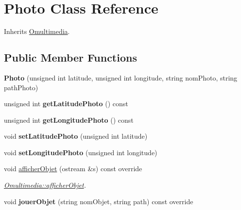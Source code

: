 \hypertarget{class_photo}{\section{Photo Class Reference}
\label{class_photo}
}


Inherits \hyperlink{class_omultimedia}{Omultimedia}.

\subsection*{Public Member Functions}
\begin{DoxyCompactItemize}
\item 
\hypertarget{class_photo_a4b68b4e4c551bbad82073932a0d3e800}{{\bfseries Photo} (unsigned int latitude, unsigned int longitude, string nom\+Photo, string path\+Photo)}\label{class_photo_a4b68b4e4c551bbad82073932a0d3e800}

\item 
\hypertarget{class_photo_a5d7841d5429264d5023baf921efd00b0}{unsigned int {\bfseries get\+Latitude\+Photo} () const }\label{class_photo_a5d7841d5429264d5023baf921efd00b0}

\item 
\hypertarget{class_photo_a081941cde635fe42bd017ef48b5f5ae6}{unsigned int {\bfseries get\+Longitude\+Photo} () const }\label{class_photo_a081941cde635fe42bd017ef48b5f5ae6}

\item 
\hypertarget{class_photo_aae3805bb2c61cb96cc11e7f09fe5bc1c}{void {\bfseries set\+Latitude\+Photo} (unsigned int latitude)}\label{class_photo_aae3805bb2c61cb96cc11e7f09fe5bc1c}

\item 
\hypertarget{class_photo_ab58d0b90b56098457653ffeddb1e03ff}{void {\bfseries set\+Longitude\+Photo} (unsigned int longitude)}\label{class_photo_ab58d0b90b56098457653ffeddb1e03ff}

\item 
void \hyperlink{class_photo_a6c80c6f056b2ec84cc30ad0afecd9806}{afficher\+Objet} (ostream \&s) const override
\begin{DoxyCompactList}\small\item\em \hyperlink{class_omultimedia_ae8942bb1db61d92962a71bbe7512c037}{Omultimedia\+::afficher\+Objet}. \end{DoxyCompactList}\item 
\hypertarget{class_photo_a5b9e3f3f830c4fd02f930fee9dc8dfb2}{void {\bfseries jouer\+Objet} (string nom\+Objet, string path) const override}\label{class_photo_a5b9e3f3f830c4fd02f930fee9dc8dfb2}

\end{DoxyCompactItemize}


